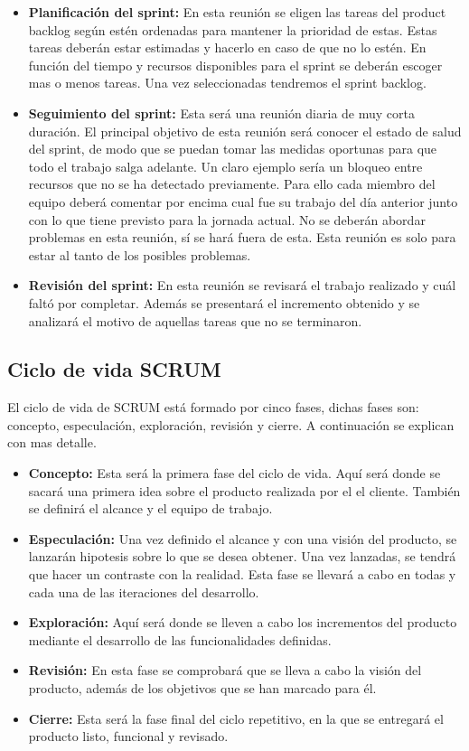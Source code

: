 \begin{itemize}
  \item \textbf{Planificación del sprint:} En esta reunión se eligen las tareas del product
     backlog según estén ordenadas para mantener la prioridad de estas. Estas tareas deberán
     estar estimadas y hacerlo en caso de que no lo estén. En función del tiempo y recursos
     disponibles para el sprint se deberán escoger mas o menos tareas. Una vez seleccionadas
     tendremos el sprint backlog.
  \item \textbf{Seguimiento del sprint:} Esta será una reunión diaria de muy corta duración.
     El principal objetivo de esta reunión será conocer el estado de salud del sprint, de modo
     que se puedan tomar las medidas oportunas para que todo el trabajo salga adelante. Un
     claro ejemplo sería un bloqueo entre recursos que no se ha detectado previamente. Para
     ello cada miembro del equipo deberá comentar por encima cual fue su trabajo del día
     anterior junto con lo que tiene previsto para la jornada actual. No se deberán abordar
     problemas en esta reunión, sí se hará fuera de esta. Esta reunión es solo para estar al
     tanto de los posibles problemas.
  \item \textbf{Revisión del sprint:} En esta reunión se revisará el trabajo realizado y cuál
     faltó por completar. Además se presentará el incremento obtenido y se analizará el motivo
     de aquellas tareas que no se terminaron.
\end{itemize}


\subsection{Ciclo de vida SCRUM}

El ciclo de vida de SCRUM está formado por cinco fases, dichas fases son: concepto, especulación,
 exploración, revisión y cierre. A continuación se explican con mas detalle.

\begin{itemize}
  \item \textbf{Concepto:} Esta será la primera fase del ciclo de vida. Aquí será donde se sacará
     una primera idea sobre el producto realizada por el el cliente. También se definirá el alcance
     y el equipo de trabajo.
  \item \textbf{Especulación:} Una vez definido el alcance y con una visión del producto, se lanzarán
     hipotesis sobre lo que se desea obtener. Una vez lanzadas, se tendrá que hacer un contraste
     con la realidad. Esta fase se llevará a cabo en todas y cada una de las iteraciones del desarrollo.
  \item \textbf{Exploración:} Aquí será donde se lleven a cabo los incrementos del producto mediante
     el desarrollo de las funcionalidades definidas.
  \item \textbf{Revisión:} En esta fase se comprobará que se lleva a cabo la visión del producto, además
     de los objetivos que se han marcado para él.
  \item \textbf{Cierre:} Esta será la fase final del ciclo repetitivo, en la que se entregará
     el producto listo, funcional y revisado.
\end{itemize}


